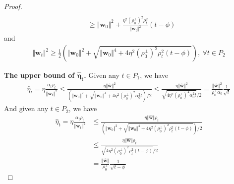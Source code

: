 \documentclass[pdflatex,sn-basic]{sn-jnl}%
\theoremstyle{thmstyleone}%
\begin{document}
\begin{appendices}
\begin{proof}
\begin{equation*}
\begin{aligned}
    \\ & \ge
    \Vert \mathbf{w}_{0} \Vert^2
    +
    \frac{
      \eta^2 \left(\rho_{0}^{\perp}\right)^2 \rho_{t}^2
    }{
      \Vert \mathbf{w}_{t} \Vert^2
    }
    \left( t - \phi \right)
  \end{aligned}
  \end{equation*}
  and
  \begin{equation*}
  \begin{aligned}
    \Vert \mathbf{w}_t \Vert^2 \ge 
    \frac{1}{2}
    \left(
      \Vert \mathbf{w}_0 \Vert^2 + 
      \sqrt{
        \Vert \mathbf{w}_0 \Vert^4 + 4  
        \eta^2 \left(\rho_{0}^{\perp}\right)^2
        \rho_{t}^2 \left(
          t - \phi
        \right)
      }
    \right),
    \ \forall t \in P_2
  \end{aligned}
  \end{equation*}

  \noindent\textbf{The upper bound of $\boldsymbol{\hat{\eta}_t}$.} 
  Given any $t \in P_1$, we have 
  \begin{equation*}
  \begin{aligned}
    \hat{\eta}_t = \eta \frac{\alpha_t \rho_t}{\Vert \mathbf{w}_t \Vert^2}
    \le 
    \frac{\eta \Vert \hat{\mathbf{w}} \Vert^2}{
      \left(
        \Vert \mathbf{w}_0 \Vert^2 + 
        \sqrt{
          \Vert \mathbf{w}_0 \Vert^4 + 4 \eta^2 (\rho_{0}^{\perp})^2 \alpha_0^2 t
        }
      \right) / 2
    }
    \le 
    \frac{\eta \Vert \hat{\mathbf{w}} \Vert^2}{
      \sqrt{
        4 \eta^2 (\rho_{0}^{\perp})^2 \alpha_0^2 t
      }
    / 2}
    = 
    \frac{\Vert \hat{\mathbf{w}} \Vert^2 }{
        \rho_{0}^{\perp} \alpha_0
    }
    \frac{1}{ \sqrt{t}}
  \end{aligned}
  \end{equation*}
  And given any $t \in P_2$, we have 
  \begin{equation*}
  \begin{aligned}
    \hat{\eta}_t = \eta \frac{\alpha_t \rho_t}{\Vert \mathbf{w}_t \Vert^2}
    & \le 
    \frac{\eta \Vert \hat{\mathbf{w}} \Vert \rho_t}{
      \left(
        \Vert \mathbf{w}_0 \Vert^2 + 
        \sqrt{
          \Vert \mathbf{w}_0 \Vert^4 + 4  
          \eta^2 \left(\rho_{0}^{\perp}\right)^2
          \rho_{t}^2 \left(
            t - \phi
          \right)
        }
      \right) / 2
    }
    \\ & \le 
    \frac{\eta \Vert \hat{\mathbf{w}} \Vert \rho_t}{
      \sqrt{
        4 \eta^2 \left(\rho_{0}^{\perp}\right)^2
        \rho_{t}^2 \left(
          t - \phi 
        \right)
      }
    / 2}
    \\ & = 
    \frac{\Vert \hat{\mathbf{w}} \Vert}{\rho_{0}^{\perp}}
    \frac{1}{\sqrt{t - \phi }}
  \end{aligned}
  \end{equation*}


\end{proof}
\end{appendices}
\end{document}
